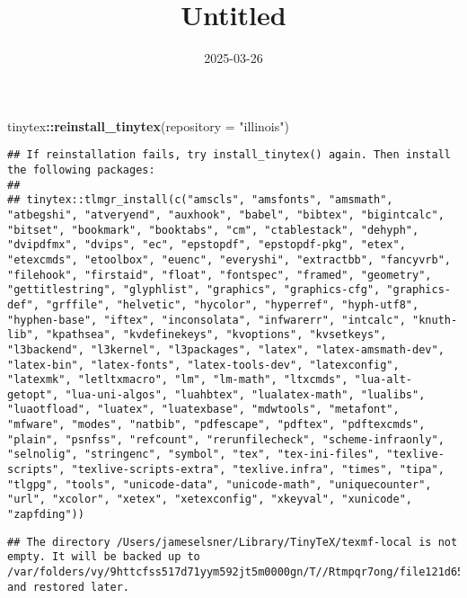 \documentclass[
]{article}
\title{Untitled}
\author{}
\date{\vspace{-2.5em}2025-03-26}
\newenvironment{Shaded}{\begin{snugshade}}{\end{snugshade}}
\newcommand{\AttributeTok}[1]{\textcolor[rgb]{0.13,0.29,0.53}{#1}}
\newcommand{\FunctionTok}[1]{\textcolor[rgb]{0.13,0.29,0.53}{\textbf{#1}}}
\newcommand{\NormalTok}[1]{#1}
\newcommand{\SpecialCharTok}[1]{\textcolor[rgb]{0.81,0.36,0.00}{\textbf{#1}}}
\newcommand{\StringTok}[1]{\textcolor[rgb]{0.31,0.60,0.02}{#1}}
\begin{document}
\maketitle

\begin{Shaded}
\begin{Highlighting}[]
\NormalTok{tinytex}\SpecialCharTok{::}\FunctionTok{reinstall\_tinytex}\NormalTok{(}\AttributeTok{repository =} \StringTok{"illinois"}\NormalTok{)}
\end{Highlighting}
\end{Shaded}

\begin{verbatim}
## If reinstallation fails, try install_tinytex() again. Then install the following packages:
## 
## tinytex::tlmgr_install(c("amscls", "amsfonts", "amsmath", "atbegshi", "atveryend", "auxhook", "babel", "bibtex", "bigintcalc", "bitset", "bookmark", "booktabs", "cm", "ctablestack", "dehyph", "dvipdfmx", "dvips", "ec", "epstopdf", "epstopdf-pkg", "etex", "etexcmds", "etoolbox", "euenc", "everyshi", "extractbb", "fancyvrb", "filehook", "firstaid", "float", "fontspec", "framed", "geometry", "gettitlestring", "glyphlist", "graphics", "graphics-cfg", "graphics-def", "grffile", "helvetic", "hycolor", "hyperref", "hyph-utf8", "hyphen-base", "iftex", "inconsolata", "infwarerr", "intcalc", "knuth-lib", "kpathsea", "kvdefinekeys", "kvoptions", "kvsetkeys", "l3backend", "l3kernel", "l3packages", "latex", "latex-amsmath-dev", "latex-bin", "latex-fonts", "latex-tools-dev", "latexconfig", "latexmk", "letltxmacro", "lm", "lm-math", "ltxcmds", "lua-alt-getopt", "lua-uni-algos", "luahbtex", "lualatex-math", "lualibs", "luaotfload", "luatex", "luatexbase", "mdwtools", "metafont", "mfware", "modes", "natbib", "pdfescape", "pdftex", "pdftexcmds", "plain", "psnfss", "refcount", "rerunfilecheck", "scheme-infraonly", "selnolig", "stringenc", "symbol", "tex", "tex-ini-files", "texlive-scripts", "texlive-scripts-extra", "texlive.infra", "times", "tipa", "tlgpg", "tools", "unicode-data", "unicode-math", "uniquecounter", "url", "xcolor", "xetex", "xetexconfig", "xkeyval", "xunicode", "zapfding"))
\end{verbatim}

\begin{verbatim}
## The directory /Users/jameselsner/Library/TinyTeX/texmf-local is not empty. It will be backed up to /var/folders/vy/9httcfss517d71yym592jt5m0000gn/T//Rtmpqr7ong/file121d65c7e2c2a and restored later.
\end{verbatim}
\end{document}
